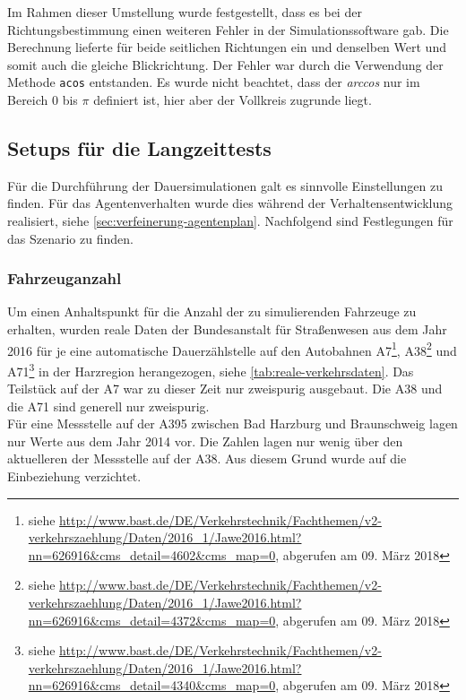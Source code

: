 Im Rahmen dieser Umstellung wurde festgestellt, dass es bei der Richtungsbestimmung einen weiteren Fehler in der Simulationssoftware gab.
Die Berechnung lieferte für beide seitlichen Richtungen ein und denselben Wert und somit auch die gleiche Blickrichtung.
Der Fehler war durch die Verwendung der Methode \texttt{acos} entstanden. Es wurde nicht beachtet, dass der \textit{arccos} nur im Bereich 0 bis $ \pi $ definiert ist, hier aber der Vollkreis zugrunde liegt.





\subsection{Setups für die Langzeittests}
\label{sec:setup-dauertests}

Für die Durchführung der Dauersimulationen galt es sinnvolle Einstellungen zu finden. 
Für das Agentenverhalten wurde dies während der Verhaltensentwicklung realisiert, siehe \cref{sec:verfeinerung-agentenplan}. 
Nachfolgend sind Festlegungen für das Szenario zu finden.



\subsubsection{Fahrzeuganzahl}
\label{sec:fahrzeuganzahl}

Um einen Anhaltspunkt für die Anzahl der zu simulierenden Fahrzeuge zu erhalten, wurden reale Daten der Bundesanstalt für Straßenwesen aus dem Jahr 2016 für je eine automatische Dauerzählstelle auf den Autobahnen A7\footnote{siehe \url{http://www.bast.de/DE/Verkehrstechnik/Fachthemen/v2-verkehrszaehlung/Daten/2016_1/Jawe2016.html?nn=626916&cms_detail=4602&cms_map=0}, abgerufen am 09. März 2018}, A38\footnote{siehe \url{http://www.bast.de/DE/Verkehrstechnik/Fachthemen/v2-verkehrszaehlung/Daten/2016_1/Jawe2016.html?nn=626916&cms_detail=4372&cms_map=0}, abgerufen am 09. März 2018} und A71\footnote{siehe \url{http://www.bast.de/DE/Verkehrstechnik/Fachthemen/v2-verkehrszaehlung/Daten/2016_1/Jawe2016.html?nn=626916&cms_detail=4340&cms_map=0}, abgerufen am 09. März 2018} in der Harzregion herangezogen, siehe \cref{tab:reale-verkehrsdaten}. 
Das Teilstück auf der A7 war zu dieser Zeit nur zweispurig ausgebaut. 
Die A38 und die A71 sind generell nur zweispurig.
\\
Für eine Messstelle auf der A395 zwischen Bad Harzburg und Braunschweig lagen nur Werte aus dem Jahr 2014 vor.
Die Zahlen lagen nur wenig über den aktuelleren der Messstelle auf der A38.
Aus diesem Grund wurde auf die Einbeziehung verzichtet.


